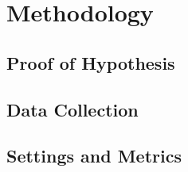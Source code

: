 \section{Methodology}
\subsection{Proof of Hypothesis}
\subsection{Data Collection}
\subsection{Settings and Metrics}
